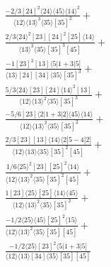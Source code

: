 \documentclass[varwidth, border=5pt]{standalone}
\begin{document}
\begin{my}
$\begin{gathered}
\scriptscriptstyle\frac{-2/3[24]^2⟨24⟩⟨45⟩⟨14⟩^2}{⟨12⟩⟨13⟩^3⟨35⟩[35]^2}+\\
\scriptscriptstyle\frac{2/3⟨24⟩^2[23][24]^2[25]⟨14⟩}{⟨13⟩^3⟨35⟩[35]^3[45]}+\\
\scriptscriptstyle\frac{-1[23]^3[13]⟨5|1+3|5]}{⟨13⟩[24][34]⟨35⟩[35]^3}+\\
\scriptscriptstyle\frac{5/3⟨24⟩[23][24]⟨14⟩^2[13]}{⟨12⟩⟨13⟩^2⟨35⟩[35]^3}+\\
\scriptscriptstyle\frac{-5/6[23]⟨2|1+3|2]⟨45⟩⟨14⟩}{⟨12⟩⟨13⟩^2⟨35⟩[35]^2}+\\
\scriptscriptstyle\frac{2/3[23][13]⟨14⟩⟨2|5-4|2]}{⟨12⟩⟨13⟩⟨35⟩[35]^2[45]}+\\
\scriptscriptstyle\frac{1/6⟨25⟩^2[23][25]^2⟨14⟩}{⟨12⟩⟨13⟩^2⟨35⟩[35]^2[45]}+\\
\scriptscriptstyle\frac{1[23]⟨25⟩[25]⟨14⟩⟨45⟩}{⟨12⟩⟨13⟩^2⟨35⟩[35]^2}+\\
\scriptscriptstyle\frac{-1/2⟨25⟩⟨45⟩[25]^2⟨15⟩}{⟨12⟩⟨13⟩^2⟨35⟩[35][45]}+\\
\scriptscriptstyle\frac{-1/2⟨25⟩[23]^2⟨5|1+3|5]}{⟨12⟩⟨13⟩[34]⟨35⟩[35][45]}\phantom{+}
\end{gathered}$
\end{my}
\end{document}
